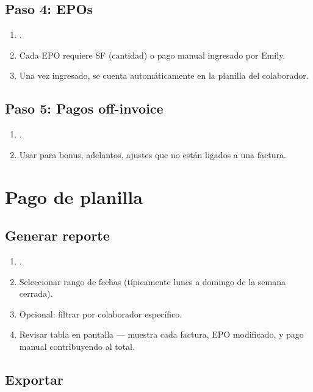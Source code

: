\documentclass[11pt,a4paper]{article}
\begin{document}
\subsection{Paso 4: EPOs}
\begin{enumerate}
  \item {}.
  \item Cada EPO requiere SF (cantidad) o pago manual ingresado por Emily.
  \item Una vez ingresado, se cuenta automáticamente en la planilla del colaborador.
\end{enumerate}

\subsection{Paso 5: Pagos off-invoice}
\begin{enumerate}
  \item {}.
  \item Usar para bonus, adelantos, ajustes que no están ligados a una factura.
\end{enumerate}

\section{Pago de planilla}

\subsection{Generar reporte}

\begin{enumerate}
  \item {}.
  \item Seleccionar rango de fechas (típicamente lunes a domingo de la semana cerrada).
  \item Opcional: filtrar por colaborador específico.
  \item Revisar tabla en pantalla --- muestra cada factura, EPO modificado, y pago manual contribuyendo al total.
\end{enumerate}

\subsection{Exportar}
\end{document}
